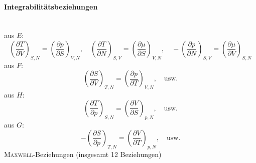 \paragraph{Integrabilitätsbeziehungen} \mbox{}\\
aus $E$:
\begin{equation}
    \left( \frac{\partial T}{\partial V} \right)_{S, N} = \left( \frac{\partial p}{\partial S} \right)_{V, N}, \quad
    \left( \frac{\partial T}{\partial N} \right)_{S, V} = \left( \frac{\partial \mu}{\partial S} \right)_{V, N}, \quad
    - \left( \frac{\partial p}{\partial N} \right)_{S, V} = \left( \frac{\partial \mu}{\partial V} \right)_{S, N}
\end{equation}
aus $F$:
\begin{equation}
    \left( \frac{\partial S}{\partial V} \right)_{T, N} = \left( \frac{\partial p}{\partial T} \right)_{V, N}, \quad \text{usw.}
\end{equation}
aus $H$:
\begin{equation}
    \left( \frac{\partial T}{\partial p} \right)_{S, N} = \left( \frac{\partial V}{\partial S} \right)_{p, N}, \quad \text{usw.}
\end{equation}
aus $G$:
\begin{equation}
    - \left( \frac{\partial S}{\partial p} \right)_{T, N} = \left( \frac{\partial V}{\partial T} \right)_{p, N}, \quad \text{usw.}
\end{equation}
\textsc{Maxwell}-Beziehungen (insgesamt 12 Beziehungen)
